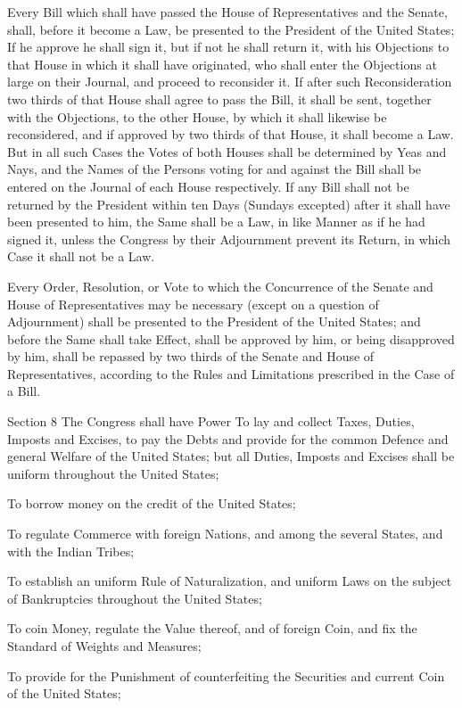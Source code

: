 \documentclass[12pt,a4paper]{article}
\begin{document}
Every Bill which shall have passed the House of Representatives and the Senate,
shall, before it become a Law, be presented to the President of the United
States; If he approve he shall sign it, but if not he shall return it, with his
Objections to that House in which it shall have originated, who shall enter the
Objections at large on their Journal, and proceed to reconsider it. If after
such Reconsideration two thirds of that House shall agree to pass the Bill, it
shall be sent, together with the Objections, to the other House, by which it
shall likewise be reconsidered, and if approved by two thirds of that House, it
shall become a Law. But in all such Cases the Votes of both Houses shall be
determined by Yeas and Nays, and the Names of the Persons voting for and
against the Bill shall be entered on the Journal of each House respectively. If
any Bill shall not be returned by the President within ten Days (Sundays
excepted) after it shall have been presented to him, the Same shall be a Law,
in like Manner as if he had signed it, unless the Congress by their Adjournment
prevent its Return, in which Case it shall not be a Law.

Every Order, Resolution, or Vote to which the Concurrence of the Senate and
House of Representatives may be necessary (except on a question of Adjournment)
shall be presented to the President of the United States; and before the Same
shall take Effect, shall be approved by him, or being disapproved by him, shall
be repassed by two thirds of the Senate and House of Representatives, according
to the Rules and Limitations prescribed in the Case of a Bill.


Section 8
The Congress shall have Power To lay and collect Taxes, Duties, Imposts and
Excises, to pay the Debts and provide for the common Defence and general
Welfare of the United States; but all Duties, Imposts and Excises shall be
uniform throughout the United States;

To borrow money on the credit of the United States;

To regulate Commerce with foreign Nations, and among the several States, and
with the Indian Tribes;

To establish an uniform Rule of Naturalization, and uniform Laws on the subject
of Bankruptcies throughout the United States;

To coin Money, regulate the Value thereof, and of foreign Coin, and fix the
Standard of Weights and Measures;

To provide for the Punishment of counterfeiting the Securities and current Coin
of the United States;
\end{document}
